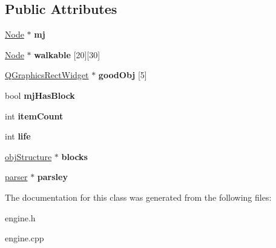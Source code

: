 \subsection*{Public Attributes}
\begin{DoxyCompactItemize}
\item 
\hypertarget{classengine_ab3a51856b749c44d32f45ab4ba653d59}{\hyperlink{class_node}{Node} $\ast$ {\bfseries mj}}\label{classengine_ab3a51856b749c44d32f45ab4ba653d59}

\item 
\hypertarget{classengine_ab994ab325c0c9fa80dea14e935f20d83}{\hyperlink{class_node}{Node} $\ast$ {\bfseries walkable} \mbox{[}20\mbox{]}\mbox{[}30\mbox{]}}\label{classengine_ab994ab325c0c9fa80dea14e935f20d83}

\item 
\hypertarget{classengine_a3f98c76f5a03777bd0e0543dae1c9725}{\hyperlink{class_q_graphics_rect_widget}{Q\-Graphics\-Rect\-Widget} $\ast$ {\bfseries good\-Obj} \mbox{[}5\mbox{]}}\label{classengine_a3f98c76f5a03777bd0e0543dae1c9725}

\item 
\hypertarget{classengine_a66bf076777496c5588df19a7191bbdb4}{bool {\bfseries mj\-Has\-Block}}\label{classengine_a66bf076777496c5588df19a7191bbdb4}

\item 
\hypertarget{classengine_a4a40819a98ac7ab07ce6669a291adfaf}{int {\bfseries item\-Count}}\label{classengine_a4a40819a98ac7ab07ce6669a291adfaf}

\item 
\hypertarget{classengine_a03e0b46f80c31f67235837a8cbb9ee27}{int {\bfseries life}}\label{classengine_a03e0b46f80c31f67235837a8cbb9ee27}

\item 
\hypertarget{classengine_ab72a971b9c7b2c4206a8d27c5a26f83d}{\hyperlink{classobj_structure}{obj\-Structure} $\ast$ {\bfseries blocks}}\label{classengine_ab72a971b9c7b2c4206a8d27c5a26f83d}

\item 
\hypertarget{classengine_a5d5f9c8f20bc2e91e4bba4afac71dbad}{\hyperlink{classparser}{parser} $\ast$ {\bfseries parsley}}\label{classengine_a5d5f9c8f20bc2e91e4bba4afac71dbad}

\end{DoxyCompactItemize}


The documentation for this class was generated from the following files\-:\begin{DoxyCompactItemize}
\item 
engine.\-h\item 
engine.\-cpp\end{DoxyCompactItemize}
